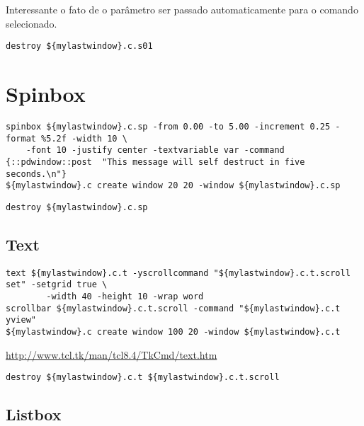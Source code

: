 Interessante o fato de o parâmetro ser passado automaticamente para o comando
selecionado.


\begin{lstlisting}
destroy ${mylastwindow}.c.s01
\end{lstlisting}

\section{Spinbox}

\begin{lstlisting}
spinbox ${mylastwindow}.c.sp -from 0.00 -to 5.00 -increment 0.25 -format %5.2f -width 10 \
    -font 10 -justify center -textvariable var -command {::pdwindow::post  "This message will self destruct in five seconds.\n"}
${mylastwindow}.c create window 20 20 -window ${mylastwindow}.c.sp
\end{lstlisting}


\begin{lstlisting}
destroy ${mylastwindow}.c.sp
\end{lstlisting}

\subsection{Text}

\begin{lstlisting}
text ${mylastwindow}.c.t -yscrollcommand "${mylastwindow}.c.t.scroll set" -setgrid true \
        -width 40 -height 10 -wrap word
scrollbar ${mylastwindow}.c.t.scroll -command "${mylastwindow}.c.t yview"
${mylastwindow}.c create window 100 20 -window ${mylastwindow}.c.t
\end{lstlisting}

\url{http://www.tcl.tk/man/tcl8.4/TkCmd/text.htm}

\begin{lstlisting}
destroy ${mylastwindow}.c.t ${mylastwindow}.c.t.scroll
\end{lstlisting}

\subsection{Listbox}

